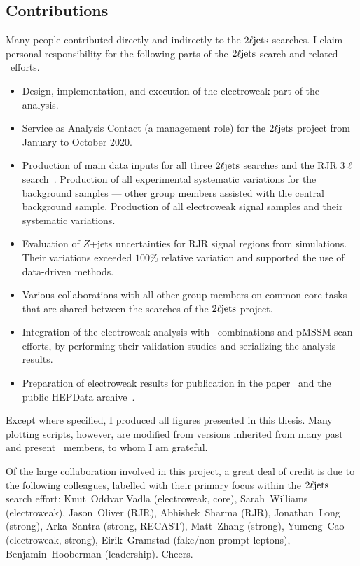 \subsection{Contributions}
Many people contributed directly and indirectly to the $2\ell\mathrm{jets}$ searches.
I claim personal responsibility for the following parts of the $2\ell\mathrm{jets}$
search and related \atlas\ efforts.
\begin{itemize}
\item Design, implementation, and execution of the electroweak part of the
analysis.
\item Service as Analysis Contact (a management role) for the $2\ell\mathrm{jets}$
project from January to October 2020.
\item Production of main data inputs for all three $2\ell\mathrm{jets}$ searches
and the RJR $3\ell$ search~\cite{atlas_rjr_3l_SUSY_2019_09}.
Production of all experimental systematic variations for the background
samples --- other group members assisted with the central background sample.
Production of all electroweak signal samples and their systematic variations.
\item Evaluation of $Z$+jets uncertainties for RJR signal regions from
simulations. Their variations exceeded $100\%$ relative variation and supported
the use of data-driven methods.
\item Various collaborations with all other group members on common core tasks
that are shared between the searches of the $2\ell\mathrm{jets}$ project.
\item Integration of the electroweak analysis with \atlas\ combinations and
pMSSM scan efforts, by performing their validation studies and serializing the
analysis results.
\item Preparation of electroweak results for publication in the
paper~\cite{atlas2022searches} and the public HEPData
archive~\cite{maguire2017hepdata}.
\end{itemize}
Except where specified, I produced all figures presented in this thesis.
Many plotting scripts, however, are modified from versions inherited from
many past and present \atlas\ members, to whom I am grateful.

Of the large collaboration involved in this project, a great deal of credit is
due to the following colleagues, labelled with their primary focus within
the $2\ell\mathrm{jets}$ search effort:
Knut~Oddvar Vadla (electroweak, core),
Sarah~Williams (electroweak),
Jason~Oliver (RJR),
Abhishek~Sharma (RJR),
Jonathan~Long (strong),
Arka~Santra (strong, RECAST),
Matt~Zhang (strong),
Yumeng~Cao (electroweak, strong),
Eirik~Gramstad (fake/non-prompt leptons),
Benjamin~Hooberman (leadership).
Cheers.


